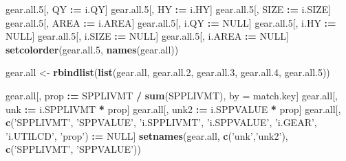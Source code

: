 \documentclass[]{article}
\newenvironment{Shaded}{\begin{snugshade}}{\end{snugshade}}
\newcommand{\KeywordTok}[1]{\textcolor[rgb]{0.13,0.29,0.53}{\textbf{#1}}}
\newcommand{\DecValTok}[1]{\textcolor[rgb]{0.00,0.00,0.81}{#1}}
\newcommand{\StringTok}[1]{\textcolor[rgb]{0.31,0.60,0.02}{#1}}
\newcommand{\OtherTok}[1]{\textcolor[rgb]{0.56,0.35,0.01}{#1}}
\newcommand{\OperatorTok}[1]{\textcolor[rgb]{0.81,0.36,0.00}{\textbf{#1}}}
\newcommand{\ErrorTok}[1]{\textcolor[rgb]{0.64,0.00,0.00}{\textbf{#1}}}
\newcommand{\NormalTok}[1]{#1}
\begin{document}
\begin{Shaded}
\begin{Highlighting}[]
\NormalTok{  gear.all.}\DecValTok{5}\NormalTok{[, QY     }\OperatorTok{:}\ErrorTok{=}\StringTok{ }\NormalTok{i.QY]}
\NormalTok{  gear.all.}\DecValTok{5}\NormalTok{[, HY     }\OperatorTok{:}\ErrorTok{=}\StringTok{ }\NormalTok{i.HY]}
\NormalTok{  gear.all.}\DecValTok{5}\NormalTok{[, SIZE   }\OperatorTok{:}\ErrorTok{=}\StringTok{ }\NormalTok{i.SIZE]}
\NormalTok{  gear.all.}\DecValTok{5}\NormalTok{[, AREA   }\OperatorTok{:}\ErrorTok{=}\StringTok{ }\NormalTok{i.AREA]}
\NormalTok{  gear.all.}\DecValTok{5}\NormalTok{[, i.QY   }\OperatorTok{:}\ErrorTok{=}\StringTok{ }\OtherTok{NULL}\NormalTok{]}
\NormalTok{  gear.all.}\DecValTok{5}\NormalTok{[, i.HY   }\OperatorTok{:}\ErrorTok{=}\StringTok{ }\OtherTok{NULL}\NormalTok{]}
\NormalTok{  gear.all.}\DecValTok{5}\NormalTok{[, i.SIZE }\OperatorTok{:}\ErrorTok{=}\StringTok{ }\OtherTok{NULL}\NormalTok{]}
\NormalTok{  gear.all.}\DecValTok{5}\NormalTok{[, i.AREA }\OperatorTok{:}\ErrorTok{=}\StringTok{ }\OtherTok{NULL}\NormalTok{]}
  \KeywordTok{setcolorder}\NormalTok{(gear.all.}\DecValTok{5}\NormalTok{, }\KeywordTok{names}\NormalTok{(gear.all))}
  
\NormalTok{  gear.all <-}\StringTok{ }\KeywordTok{rbindlist}\NormalTok{(}\KeywordTok{list}\NormalTok{(gear.all, gear.all.}\DecValTok{2}\NormalTok{, gear.all.}\DecValTok{3}\NormalTok{, }
\NormalTok{                             gear.all.}\DecValTok{4}\NormalTok{, gear.all.}\DecValTok{5}\NormalTok{))}
  
\NormalTok{  gear.all[, prop }\OperatorTok{:}\ErrorTok{=}\StringTok{ }\NormalTok{SPPLIVMT }\OperatorTok{/}\StringTok{ }\KeywordTok{sum}\NormalTok{(SPPLIVMT), by =}\StringTok{ }\NormalTok{match.key]}
\NormalTok{  gear.all[, unk  }\OperatorTok{:}\ErrorTok{=}\StringTok{ }\NormalTok{i.SPPLIVMT }\OperatorTok{*}\StringTok{ }\NormalTok{prop]}
\NormalTok{  gear.all[, unk2 }\OperatorTok{:}\ErrorTok{=}\StringTok{ }\NormalTok{i.SPPVALUE }\OperatorTok{*}\StringTok{ }\NormalTok{prop]}
\NormalTok{  gear.all[, }\KeywordTok{c}\NormalTok{(}\StringTok{'SPPLIVMT'}\NormalTok{, }\StringTok{'SPPVALUE'}\NormalTok{, }\StringTok{'i.SPPLIVMT'}\NormalTok{, }\StringTok{'i.SPPVALUE'}\NormalTok{, }\StringTok{'i.GEAR'}\NormalTok{, }
               \StringTok{'i.UTILCD'}\NormalTok{, }\StringTok{'prop'}\NormalTok{) }\OperatorTok{:}\ErrorTok{=}\StringTok{ }\OtherTok{NULL}\NormalTok{]}
  \KeywordTok{setnames}\NormalTok{(gear.all, }\KeywordTok{c}\NormalTok{(}\StringTok{'unk'}\NormalTok{,}\StringTok{'unk2'}\NormalTok{), }\KeywordTok{c}\NormalTok{(}\StringTok{'SPPLIVMT'}\NormalTok{, }\StringTok{'SPPVALUE'}\NormalTok{))}
  

\end{Highlighting}
\end{Shaded}
\end{document}
